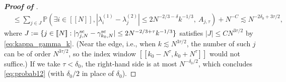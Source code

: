 \documentclass[10pt,reqno]{amsart}
\numberwithin{equation}{section}
\numberwithin{figure}{section}
\theoremstyle{plain} %
\theoremstyle{definition} %
\renewcommand{\txt}[1]{\text{\rm{#1}}}
\renewcommand{\P}{\mathbb{P}}
\newcommand{\qq}[1]{[\![{#1}]\!]}
\numberwithin{equation}{section}
\begin{document}
\begin{proof}[\bf Proof of ]
\begin{align*}
&\le \sum_{j\in J} \P \left(\exists i\in \qq{N}, |\lambda_i^{(1)}-\lambda_j^{(2)}|\le 2N^{-2/3-\delta}k^{-1/3},\ A_{j,\tau}\right) + N^{-C} \lesssim N^{-2\delta_0+3\tau/2},
\end{align*}
where $J:=\{j\in\qq{N}:|\gamma_{j,N}^{\txt{sc}}-\gamma_{k_0,N}^{\txt{sc}}|\le 2N^{-2/3+\tau}k^{-1/3}\}$ satisfies $|J|\le CN^{3\tau/2}$ by \eqref{eq:kappa_gamma_k}. (Near the edge, i.e., when $k\lesssim N^{3\tau/2}$, the number of such $j$ can be of order $N^{3\tau/2}$, so the index window $\qq{k_0-N^\tau,k_0+N^\tau}$ would not suffice.) If we take $\tau<{\delta_0}$, the right-hand side is at most $N^{-\delta_0/2}$, which concludes \eqref{eq:probab12} (with $\delta_0/2$ in place of $\delta_0$).




\end{proof}
\end{document}
